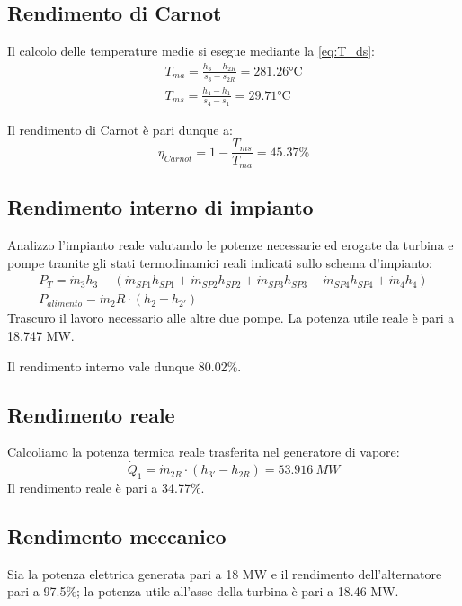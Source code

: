\subsection{Rendimento di Carnot}
Il calcolo delle temperature medie si esegue mediante la \eqref{eq:T_ds}: 
\begin{align*}
    T_{ma} = \frac{h_3-h_{2R}}{s_3-s_{2R}} = 281.26 \text{°C} \\
    T_{ms} = \frac{h_4-h_1}{s_4-s_1} = 29.71 \text{°C}
\end{align*}

Il rendimento di Carnot è pari dunque a:
\begin{equation*}
    \eta_{Carnot} = 1 - \frac{T_{ms}}{T_{ma}} = 45.37\%
\end{equation*}

\subsection{Rendimento interno di impianto}
Analizzo l'impianto reale valutando le potenze necessarie ed erogate da turbina e pompe tramite gli stati termodinamici reali indicati sullo schema d'impianto:
\begin{align*}
    P_T = \dot m_3 h_3 - (\dot m_{SP1}h_{SP1}+ \dot m_{SP2}h_{SP2}+ \dot m_{SP3}h_{SP3}+ \dot m_{SP4}h_{SP4}+ \dot m_4h_4) \\
    P_{alimento} = \dot m_2R \cdot (h_2 - h_{2'})
\end{align*}
Trascuro il lavoro necessario alle altre due pompe.
La potenza utile reale è pari a 18.747 MW.

Il rendimento interno vale dunque 80.02\%.

\subsection{Rendimento reale}
Calcoliamo la potenza termica reale trasferita nel generatore di vapore:
\begin{equation*}
    \dot Q_1 = \dot m_{2R} \cdot (h_{3'} - h_{2R}) = 53.916\ MW
\end{equation*}
Il rendimento reale è pari a 34.77\%.

\subsection{Rendimento meccanico}
Sia la potenza elettrica generata pari a 18 MW e il rendimento dell'alternatore pari a 97.5\%; la potenza utile all'asse della turbina è pari a 18.46 MW.

